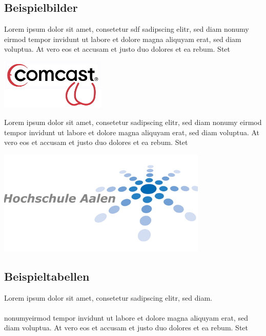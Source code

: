 \clearpage

\subsection{Beispielbilder}
Lorem ipsum dolor sit amet, consetetur  sdf sadipscing elitr, sed diam nonumy eirmod tempor invidunt ut labore et dolore magna aliquyam erat, sed diam voluptua. At vero eos et accusam et justo duo dolores et ea rebum. Stet

\begin{center}
	\includegraphics[width=5cm]{images/company_logo.png}
\end{center}

Lorem ipsum dolor sit amet, consetetur sadipscing elitr, sed diam nonumy eirmod tempor invidunt ut labore et dolore magna aliquyam erat, sed diam voluptua. At vero eos et accusam et justo duo dolores et ea rebum. Stet
\begin{center}
	\includegraphics[width=10cm]{images/institute_logo.png}
\end{center}


\clearpage

\subsection{Beispieltabellen}
Lorem ipsum dolor sit amet, consetetur sadipscing elitr, sed diam.\\\\
 nonumyeirmod tempor invidunt ut labore et dolore magna aliquyam erat, sed diam voluptua. At vero eos et accusam et justo duo dolores et ea rebum. Stet


